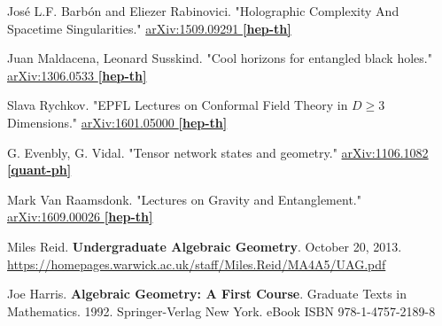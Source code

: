 \documentclass[10pt]{amsart}
\begin{document}
\begin{thebibliography}{9}
Jos\'{e} L.F. Barb\'{o}n and Eliezer Rabinovici.  "Holographic Complexity And Spacetime Singularities."  \href{https://arxiv.org/abs/1509.09291v3}{arXiv:1509.09291 \textbf{[hep-th]}}

Juan Maldacena, Leonard Susskind.  "Cool horizons for entangled black holes."  \href{https://arxiv.org/abs/1306.0533}{ 	arXiv:1306.0533 \textbf{[hep-th]}}

Slava Rychkov.  "EPFL Lectures on Conformal Field Theory in $D \geq 3$ Dimensions."    \href{https://arxiv.org/abs/1601.05000}{arXiv:1601.05000 \textbf{[hep-th]}}

G. Evenbly, G. Vidal.  "Tensor network states and geometry."  \href{https://arxiv.org/abs/1106.1082}{arXiv:1106.1082 \textbf{[quant-ph]}}

Mark Van Raamsdonk.  "Lectures on Gravity and Entanglement."  \href{https://arxiv.org/abs/1609.00026}{arXiv:1609.00026 \textbf{[hep-th]}}


Miles Reid. \textbf{Undergraduate Algebraic Geometry}. October 20, 2013. \url{https://homepages.warwick.ac.uk/staff/Miles.Reid/MA4A5/UAG.pdf}

Joe Harris. \textbf{Algebraic Geometry: A First Course}. Graduate Texts in Mathematics. 1992. Springer-Verlag New York.   eBook ISBN 978-1-4757-2189-8
    




\end{thebibliography}
\end{document}
